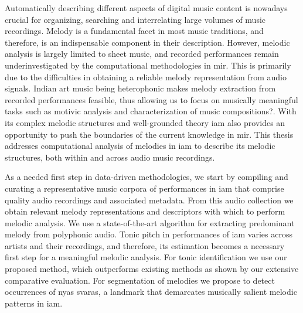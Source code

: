 
Automatically describing different aspects of digital music content is nowadays crucial for organizing, searching and interrelating large volumes of music recordings. Melody is a fundamental facet in most music traditions, and therefore, is an indispensable component in their description. However, melodic analysis is largely limited to sheet music, and recorded performances remain underinvestigated by the computational methodologies in \gls{mir}. This is primarily due to the difficulties in obtaining a reliable melody representation from audio signals. Indian art music being heterophonic makes melody extraction from recorded performances feasible, thus allowing us to focus on musically meaningful tasks such as motivic analysis and characterization of music compositions?. With its complex melodic structures and well-grounded theory \gls{iam} also provides an opportunity to push the boundaries of the current knowledge in \gls{mir}. This thesis addresses computational analysis of melodies in \gls{iam} to describe its melodic structures, both within and across audio music recordings.

As a needed first step in data-driven methodologies, we start by compiling and curating a representative music corpora of performances in \gls{iam} that comprise quality audio recordings and associated metadata. From this audio collection we obtain relevant melody representations and descriptors with which to perform melodic analysis. We use a state-of-the-art algorithm for extracting predominant melody from polyphonic audio. Tonic pitch in performances of \gls{iam} varies across artists and their recordings, and therefore, its estimation becomes a necessary first step for a meaningful melodic analysis.  For tonic identification we use our proposed method, which outperforms existing methods as shown by our extensive comparative evaluation. For segmentation of melodies we propose to detect occurrences of nyas svaras, a landmark that demarcates musically salient melodic patterns in \gls{iam}. 

